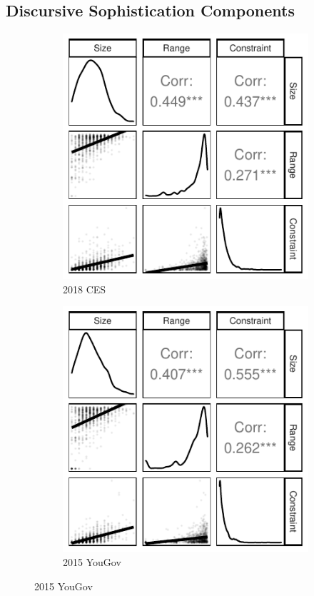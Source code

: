\documentclass[12pt]{article}
\begin{document}
\clearpage
\subsection{Discursive Sophistication Components}\label{app:components}
\begin{figure}[h]
	\centering
	\begin{subfigure}[h]{0.27\textwidth}
		\centering
		\includegraphics[width=\textwidth]{../out/appB4a-ces2018_components.pdf}
		\caption{2018 CES}
	\end{subfigure}%
	\begin{subfigure}[h]{0.27\textwidth}
		\centering
		\includegraphics[width=\textwidth]{../out/appB4b-yg2015_components.pdf}
		\caption{2015 YouGov}
	\end{subfigure}%
	

\end{figure}
\end{document}
